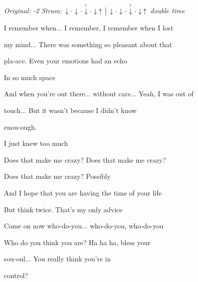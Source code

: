 \begin{song}


\begin{headerbox}
\RaiseBoxWithAccents
\textit{Original: -2} \quad
\textit{Strum:} $\Down\Miss\Down\Miss\AccentDown\Miss\Down\Up \Separator \Down\Miss\Down\Miss\AccentDown\Miss\Down\Up$ \textit{double time}
\end{headerbox}


\begin{hchordbox}
\end{hchordbox}

\Large

\bigskip

 I remember when... I remember, I remember when I lost \par
my mind... There was something so pleasant about that \par
pla-ace. Even your emotions had an echo \par
In so much space  \par

\bigskip

 And when you're out there... without care... Yeah, I was out of \par
{}touch... But it wasn't because I didn't know \par
enou-ough.  \par
I just knew too much  \par

\bigskip

Does that make me crazy? Does that make me crazy? \par
Does that make me crazy? Possibly  \par

\bigskip

 And I hope that you are having the time of your life  \par
But think twice.  That's my only advice  \par

\bigskip

 Come on now who-do-you... who-do-you, who-do-you \par
Who do you think you are? Ha ha ha, bless your \par
sou-oul...  You really think you're in \par
control?  \par


\end{song}

